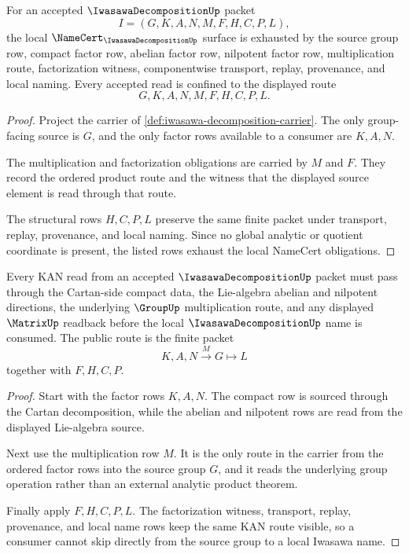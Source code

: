 \begin{theorem}
\label{thm:iwasawa-decomposition-namecert-obligations}
For an accepted $\IwasawaDecompositionUp$ packet
$$
I=(G,K,A,N,M,F,H,C,P,L),
$$
the local $\NameCert_{\IwasawaDecompositionUp}$ surface is exhausted by the source group row, compact factor row, abelian factor row, nilpotent factor row, multiplication route, factorization witness, componentwise transport, replay, provenance, and local naming. Every accepted read is confined to the displayed route
$$
G,K,A,N,M,F,H,C,P,L .
$$
\end{theorem}
\begin{proof}
Project the carrier of \autoref{def:iwasawa-decomposition-carrier}. The only group-facing source is $G$, and the only factor rows available to a consumer are $K,A,N$.

The multiplication and factorization obligations are carried by $M$ and $F$. They record the ordered product route and the witness that the displayed source element is read through that route.

The structural rows $H,C,P,L$ preserve the same finite packet under transport, replay, provenance, and local naming. Since no global analytic or quotient coordinate is present, the listed rows exhaust the local NameCert obligations.
\end{proof}

\begin{theorem}
\label{thm:iwasawa-decomposition-kan-route}
Every KAN read from an accepted $\IwasawaDecompositionUp$ packet must pass through the Cartan-side compact data, the Lie-algebra abelian and nilpotent directions, the underlying $\GroupUp$ multiplication route, and any displayed $\MatrixUp$ readback before the local $\IwasawaDecompositionUp$ name is consumed. The public route is the finite packet
$$
K,A,N \xrightarrow{M} G \longmapsto L
$$
together with $F,H,C,P$.
\end{theorem}
\begin{proof}
Start with the factor rows $K,A,N$. The compact row is sourced through the Cartan decomposition, while the abelian and nilpotent rows are read from the displayed Lie-algebra source.

Next use the multiplication row $M$. It is the only route in the carrier from the ordered factor rows into the source group $G$, and it reads the underlying group operation rather than an external analytic product theorem.

Finally apply $F,H,C,P,L$. The factorization witness, transport, replay, provenance, and local name rows keep the same KAN route visible, so a consumer cannot skip directly from the source group to a local Iwasawa name.
\end{proof}

